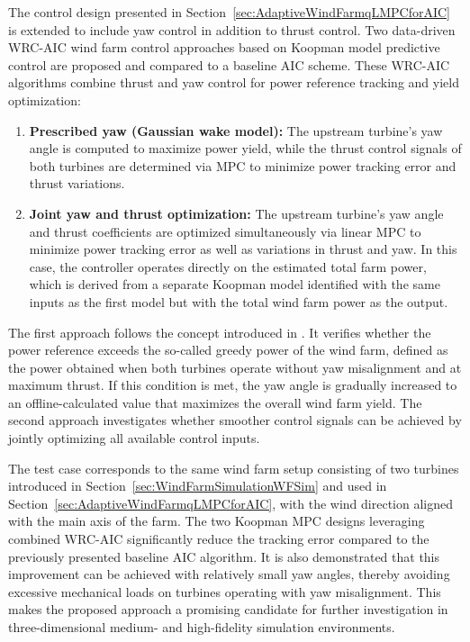 The control design presented in Section~\ref{sec:AdaptiveWindFarmqLMPCforAIC} is extended to include yaw control in addition to thrust control. Two data-driven WRC-AIC wind farm control approaches based on Koopman model predictive control are proposed and compared to a baseline AIC scheme. These WRC-AIC algorithms combine thrust and yaw control for power reference tracking and yield optimization:
\begin{enumerate}
    \item \textbf{Prescribed yaw (Gaussian wake model):}  
    The upstream turbine's yaw angle is computed to maximize power yield, while the thrust control signals of both turbines are determined via MPC to minimize power tracking error and thrust variations.%
    
    \item \textbf{Joint yaw and thrust optimization:}  
    The upstream turbine's yaw angle and thrust coefficients are optimized simultaneously via linear MPC to minimize power tracking error as well as variations in thrust and yaw. In this case, the controller operates directly on the estimated total farm power, which is derived from a separate Koopman model identified with the same inputs as the first model but with the total wind farm power as the output. %
\end{enumerate}
The first approach follows the concept introduced in \cite{boersma2017tutorial}. It verifies whether the power reference exceeds the so-called greedy power of the wind farm, defined as the power obtained when both turbines operate without yaw misalignment and at maximum thrust. If this condition is met, the yaw angle is gradually increased to an offline-calculated value that maximizes the overall wind farm yield. The second approach investigates whether smoother control signals can be achieved by jointly optimizing all available control inputs.

The test case corresponds to the same wind farm setup consisting of two turbines introduced in Section~\ref{sec:WindFarmSimulationWFSim} and used in Section~\ref{sec:AdaptiveWindFarmqLMPCforAIC}, with the wind direction aligned with the main axis of the farm. The two Koopman MPC designs leveraging combined WRC-AIC significantly reduce the tracking error compared to the previously presented baseline AIC algorithm. It is also demonstrated that this improvement can be achieved with relatively small yaw angles, thereby avoiding excessive mechanical loads on turbines operating with yaw misalignment. This makes the proposed approach a promising candidate for further investigation in three-dimensional medium- and high-fidelity simulation environments.

